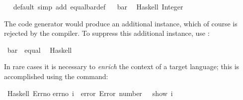 \begin{isabellebody}
\isanewline
{}\isamarkupfalse%
\ \isamarkupfalse%
\ default\ {}simp\ add{}\ equal{}bar{}def{}\isanewline
\isanewline
{}\isamarkupfalse%
%
\endisatagquote
{\isafoldquote}%
%
\isadelimquote
%
\endisadelimquote
%
\isadelimquotett
\ %
\endisadelimquotett
%
\isatagquotett
{}\isamarkupfalse%
\ bar\isanewline
\ \ {}Haskell\ {}Integer{}{}%
\endisatagquotett
{\isafoldquotett}%
%
\isadelimquotett
%
\endisadelimquotett
%
\begin{isamarkuptext}%
\noindent The code generator would produce an additional instance,
  which of course is rejected by the  compiler.  To
  suppress this additional instance, use \hypertarget{command.code-instance}{\hyperlink{command.code-instance}{\mbox{}}}:%
\end{isamarkuptext}%
\isamarkuptrue%
%
\isadelimquotett
%
\endisadelimquotett
%
\isatagquotett
{}\isamarkupfalse%
\ bar\ {}{}\ equal\isanewline
\ \ {}Haskell\ {}{}%
\endisatagquotett
{\isafoldquotett}%
%
\isadelimquotett
%
\endisadelimquotett
%
\isamarkuptrue%
%
\begin{isamarkuptext}%
In rare cases it is necessary to \emph{enrich} the context of a
  target language; this is accomplished using the \hypertarget{command.code-include}{\hyperlink{command.code-include}{\mbox{}}} command:%
\end{isamarkuptext}%
\isamarkuptrue%
%
\isadelimquotett
%
\endisadelimquotett
%
\isatagquotett
{}\isamarkupfalse%
\ Haskell\ {}Errno{}\isanewline
{}errno\ i\ {}\ error\ {}{}Error\ number{}\ {}\ {}{}\ show\ i{}{}\isanewline

\end{isabellebody}
